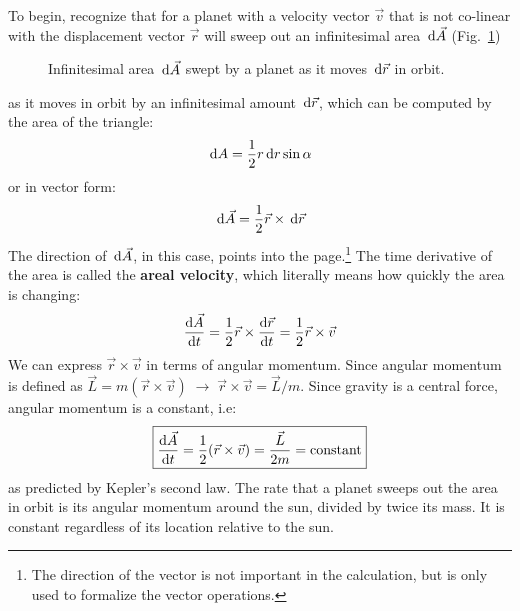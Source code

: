 \documentclass{../../../oss-handout}
\begin{document}
To begin, recognize that for a planet with a velocity vector $\vec v$ that is
not co-linear with the displacement vector $\vec r$ will sweep out an
infinitesimal area $\dl{\vec A}$ (Fig.~\ref{fig:dA})
\begin{figure}[ht]
  \centering
  \caption{Infinitesimal area $\dl{\vec A}$ swept by a planet as it moves
    $\dl{\vec r}$ in orbit.}
  \label{fig:dA}
\end{figure}
as it moves in orbit by an infinitesimal amount $\dl{\vec r}$, which can be
computed by the area of the triangle:
\begin{equation}
  \dl A=\frac12r\dl{r}\sin\alpha
\end{equation}
or in vector form:
\begin{equation}
  \dl{\vec A}=\frac12\vec r\times \dl{\vec r}
\end{equation}
The direction of $\dl{\vec A}$, in this case, points into the page.\footnote{The
  direction of the vector is not important in the calculation, but is only used
  to formalize the vector operations.} The time derivative of the area is
called the \textbf{areal velocity}, which literally means how quickly the area
is changing:
\begin{equation}
  \diff{\vec A}t
  =\frac12\vec r\times\diff{\vec r}t
  =\frac12\vec r\times\vec v
\end{equation}
We can express $\vec r\times\vec v$ in terms of angular momentum. Since
angular momentum is defined as $\vec L=m(\vec r\times\vec v)\;\rightarrow\;
\vec r\times\vec v=\vec L/m$. Since gravity is a central force, angular
momentum is a constant, i.e:
\begin{equation}
  \boxed{\diff{\vec A}t=\frac12(\vec r\times\vec v)=\frac{\vec L}{2m}=
    \text{constant}
  }
  \label{constant}
\end{equation}
as predicted by Kepler's second law. The rate that a planet sweeps out the area
in orbit is its angular momentum around the sun, divided by twice its mass. It
is constant regardless of its location relative to the sun.
\end{document}
